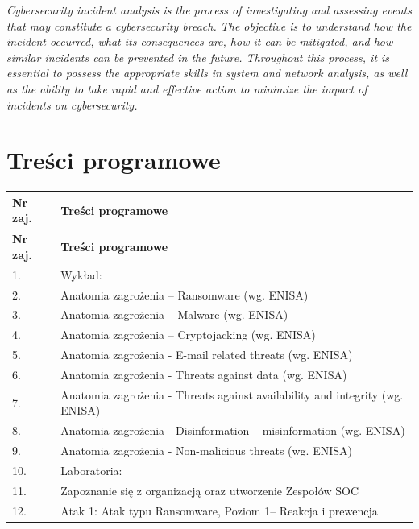 \documentclass[12pt, a4paper]{article}
\newcommand{\thdrule}{\noalign{\global\setlength{\extrarowheight}{0pt}}}
\newcommand{\thdend}{\noalign{\global\setlength{\extrarowheight}{3pt}}}
\begin{document}
\textit{Cybersecurity incident analysis is the process of investigating and assessing events that may constitute a cybersecurity breach. The objective is to understand how the incident occurred, what its consequences are, how it can be mitigated, and how similar incidents can be prevented in the future. Throughout this process, it is essential to possess the appropriate skills in system and network analysis, as well as the ability to take rapid and effective action to minimize the impact of incidents on cybersecurity.}


\section{Treści programowe}

{\scriptsize
\begin{longtable}{m{1.5cm}m{14.5cm}}
\thdrule\toprule
\rowcolor{pjatkRed} {\color{white}\textbf{Nr zaj.}} & {\color{white}\textbf{Treści programowe}} \\
\midrule\thdend
\endfirsthead
\thdrule\toprule
\rowcolor{pjatkRed} {\color{white}\textbf{Nr zaj.}} & {\color{white}\textbf{Treści programowe}} \\
\midrule\thdend
\endhead
  \rowcolor{tableRowLight} 1. & Wykład: \\
  \rowcolor{tableRowAlt} 2. & Anatomia zagrożenia – Ransomware (wg. ENISA) \\
  \rowcolor{tableRowLight} 3. & Anatomia zagrożenia – Malware (wg. ENISA) \\
  \rowcolor{tableRowAlt} 4. & Anatomia zagrożenia – Cryptojacking (wg. ENISA) \\
  \rowcolor{tableRowLight} 5. & Anatomia zagrożenia - E-mail related threats (wg. ENISA) \\
  \rowcolor{tableRowAlt} 6. & Anatomia zagrożenia - Threats against data (wg. ENISA) \\
  \rowcolor{tableRowLight} 7. & Anatomia zagrożenia - Threats against availability and integrity (wg. ENISA) \\
  \rowcolor{tableRowAlt} 8. & Anatomia zagrożenia - Disinformation – misinformation (wg. ENISA) \\
  \rowcolor{tableRowLight} 9. & Anatomia zagrożenia - Non-malicious threats (wg. ENISA) \\
  \rowcolor{tableRowAlt} 10. & Laboratoria: \\
  \rowcolor{tableRowLight} 11. & Zapoznanie się z organizacją oraz utworzenie Zespołów SOC \\
  \rowcolor{tableRowAlt} 12. & Atak 1: Atak typu Ransomware, Poziom 1– Reakcja i prewencja \\

\end{longtable}}
\end{document}
